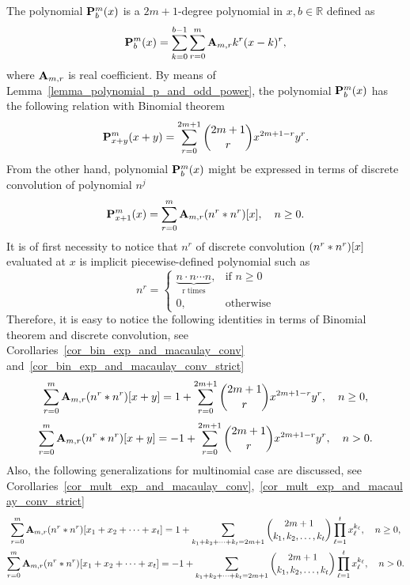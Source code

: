 The polynomial $\polynomialP{m}{b}{x}$ is a $2m+1$-degree polynomial in $x,b\in\mathbb{R}$ defined as
\begin{align*}
    \polynomialP{m}{b}{x} = \sum_{k=0}^{b-1} \sum_{r=0}^{m} \coeffA{m}{r} k^r(x-k)^r,
\end{align*}
where $\coeffA{m}{r}$ is real coefficient.
By means of Lemma~\ref{lemma_polynomial_p_and_odd_power},
the polynomial $\polynomialP{m}{b}{x}$ has the following relation with Binomial theorem~\cite{AbraSteg72}
\begin{align*}
    \polynomialP{m}{x+y}{x+y} = \sum_{r=0}^{2m+1} \binom{2m+1}{r} x^{2m+1-r} y^r.
\end{align*}
From the other hand, polynomial $\polynomialP{m}{b}{x}$ might be expressed in terms of discrete convolution
of polynomial $n^j$
\begin{align*}
    \polynomialP{m}{x+1}{x} = \sum_{r=0}^{m} \coeffA{m}{r} \convPower{n}{r}{x}, \quad n\geq 0.
\end{align*}
It is of first necessity to notice that  $n^r$ of discrete convolution $\convPower{n}{r}{x}$ evaluated at $x$
is implicit piecewise-defined polynomial such as
\begin{equation*}
    n^{r} =
    \begin{cases}
        \underbrace{n \cdot n \cdots n}_{\mathrm{r \; times}}, & \mbox{if } n \geq 0 \\
        0, & \mbox{otherwise}
    \end{cases}
\end{equation*}
Therefore, it is easy to notice the following identities in terms of Binomial theorem and discrete convolution,
see Corollaries~\ref{cor_bin_exp_and_macaulay_conv} and~\ref{cor_bin_exp_and_macaulay_conv_strict}
\begin{equation*}
    \sum_{r=0}^{m} \coeffA{m}{r} \convPower{n}{r}{x+y}
    =
    1 + \sum_{r=0}^{2m+1} \binom{2m+1}{r} x^{2m+1-r} y^r, \quad n \geq 0,
\end{equation*}
\begin{equation*}
    \sum_{r=0}^{m} \coeffA{m}{r} \convPower{n}{r}{x+y}
    =
    -1 + \sum_{r=0}^{2m+1} \binom{2m+1}{r} x^{2m+1-r} y^r, \quad n > 0.
\end{equation*}
Also, the following generalizations for multinomial case are discussed,
see Corollaries~\ref{cor_mult_exp_and_macaulay_conv},~\ref{cor_mult_exp_and_macaulay_conv_strict}
\begin{gather*}
    \sum_{r=0}^{m} \coeffA{m}{r} \convPower{n}{r}{\multifoldSum{t}} =
    1 + \sum_{\multifoldSum[k]{t}=2m+1} \binom{2m+1}{k_1, k_2,\ldots, k_t} \prod_{\ell=1}^{t} x_\ell^{k_\ell},
    \quad n \geq 0,\\
    \sum_{r=0}^{m} \coeffA{m}{r} \convPower{n}{r}{\multifoldSum{t}} =
    -1 + \sum_{\multifoldSum[k]{t}=2m+1} \binom{2m+1}{k_1, k_2,\ldots, k_t} \prod_{\ell=1}^{t} x_\ell^{k_\ell},
    \quad n > 0.\\
\end{gather*}

